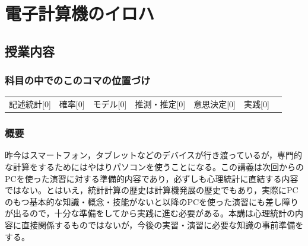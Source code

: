 \section{電子計算機のイロハ}
\label{D1_lesson02}

\subsection{授業内容}
\subsubsection{科目の中でのこのコマの位置づけ}
\begin{tabular}[t]{ccccccc}
    記述統計[0] & 確率[0] & モデル[0] & 推測・推定[0] & 意思決定[0] & 実践[0]
\end{tabular}
\subsubsection{概要}
昨今はスマートフォン，タブレットなどのデバイスが行き渡っているが，専門的な計算をするためにはやはりパソコンを使うことになる。この講義は次回からのPCを使った演習に対する準備的内容であり，必ずしも心理統計に直結する内容ではない。とはいえ，統計計算の歴史は計算機発展の歴史でもあり，実際にPCのもつ基本的な知識・概念・技能がないと以降のPCを使った演習にも差し障りが出るので，十分な準備をしてから実践に進む必要がある。本講は心理統計の内容に直接関係するものではないが，今後の実習・演習に必要な知識の事前準備をする。
